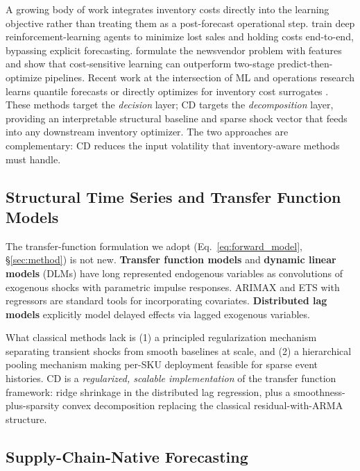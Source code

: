 \documentclass[10pt]{article} %
\theoremstyle{plain}
\theoremstyle{definition}
\begin{document}
A growing body of work integrates inventory costs directly into the learning objective rather than treating them as a post-forecast operational step. \citet{orojlooy2020applying} train deep reinforcement-learning agents to minimize lost sales and holding costs end-to-end, bypassing explicit forecasting. \citet{bertsimas2020predictive} formulate the newsvendor problem with features and show that cost-sensitive learning can outperform two-stage predict-then-optimize pipelines. Recent work at the intersection of ML and operations research learns quantile forecasts or directly optimizes for inventory cost surrogates \citep{ban2019big}. These methods target the \emph{decision} layer; CD targets the \emph{decomposition} layer, providing an interpretable structural baseline and sparse shock vector that feeds into any downstream inventory optimizer. The two approaches are complementary: CD reduces the input volatility that inventory-aware methods must handle.

\subsection{Structural Time Series and Transfer Function Models}

The transfer-function formulation we adopt (Eq.~\eqref{eq:forward_model}, \S\ref{sec:method}) is not new. \textbf{Transfer function models} \citep{box1970time, box2016time} and \textbf{dynamic linear models} (DLMs) \citep{harvey1990forecasting, durbin2012time} have long represented endogenous variables as convolutions of exogenous shocks with parametric impulse responses. ARIMAX and ETS with regressors \citep{hyndman2008automatic} are standard tools for incorporating covariates. \textbf{Distributed lag models} \citep{lutkepohl2005new, shumway2017time} explicitly model delayed effects via lagged exogenous variables.

What classical methods lack is (1) a principled regularization mechanism separating transient shocks from smooth baselines at scale, and (2) a hierarchical pooling mechanism making per-SKU deployment feasible for sparse event histories. CD is a \emph{regularized, scalable implementation} of the transfer function framework: ridge shrinkage in the distributed lag regression, plus a smoothness-plus-sparsity convex decomposition replacing the classical residual-with-ARMA structure.

\subsection{Supply-Chain-Native Forecasting}
\end{document}
